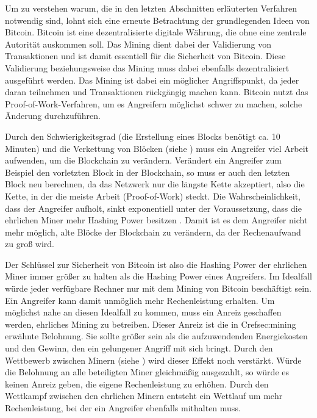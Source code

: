 \documentclass[ngerman,runningheads,a4paper]{llncs}[2018/03/10]
\begin{document}
Um zu verstehen warum, die in den letzten Abschnitten erläuterten Verfahren notwendig sind, lohnt sich eine erneute Betrachtung der grundlegenden Ideen von Bitcoin. Bitcoin ist eine dezentralisierte digitale Währung, die ohne eine zentrale Autorität auskommen soll. Das Mining dient dabei der Validierung von Transaktionen und ist damit essentiell für die Sicherheit von Bitcoin. Diese Validierung beziehungsweise das Mining muss dabei ebenfalls dezentralisiert ausgeführt werden. Das Mining ist dabei ein möglicher Angriffspunkt, da jeder daran teilnehmen und Transaktionen rückgängig machen kann. Bitcoin nutzt das Proof-of-Work-Verfahren, um es Angreifern möglichst schwer zu machen, solche Änderung durchzuführen.

Durch den Schwierigkeitsgrad (die Erstellung eines Blocks benötigt ca. 10 Minuten) und die Verkettung von Blöcken (siehe ) muss ein Angreifer viel Arbeit aufwenden, um die Blockchain zu verändern. Verändert ein Angreifer zum Beispiel den vorletzten Block in der Blockchain, so muss er auch den letzten Block neu berechnen, da das Netzwerk nur die längste Kette akzeptiert, also die Kette, in der die meiste Arbeit (Proof-of-Work) steckt. Die Wahrscheinlichkeit, dass der Angreifer aufholt, sinkt exponentiell unter der Voraussetzung, dass die ehrlichen Miner mehr Hashing Power besitzen \citep{bitcoinPDF}. Damit ist es dem Angreifer nicht mehr möglich, alte Blöcke der Blockchain zu verändern, da der Rechenaufwand zu groß wird.

Der Schlüssel zur Sicherheit von Bitcoin ist also die Hashing Power der ehrlichen Miner immer größer zu halten als die Hashing Power eines Angreifers. Im Idealfall würde jeder verfügbare Rechner nur mit dem Mining von Bitcoin beschäftigt sein. Ein Angreifer kann damit unmöglich mehr Rechenleistung erhalten. Um möglichst nahe an diesen Idealfall zu kommen, muss ein Anreiz geschaffen werden, ehrliches Mining zu betreiben. Dieser Anreiz ist die in Cref{sec:mining} erwähnte Belohnung. Sie sollte größer sein als die aufzuwendenden Energiekosten und den Gewinn, den ein gelungener Angriff mit sich bringt. Durch den Wettbewerb zwischen Minern (siehe ) wird dieser Effekt noch verstärkt. Würde die Belohnung an alle beteiligten Miner gleichmäßig ausgezahlt, so würde es keinen Anreiz geben, die eigene Rechenleistung zu erhöhen. Durch den Wettkampf zwischen den ehrlichen Minern entsteht ein Wettlauf um mehr Rechenleistung, bei der ein Angreifer ebenfalls mithalten muss.
\end{document}
